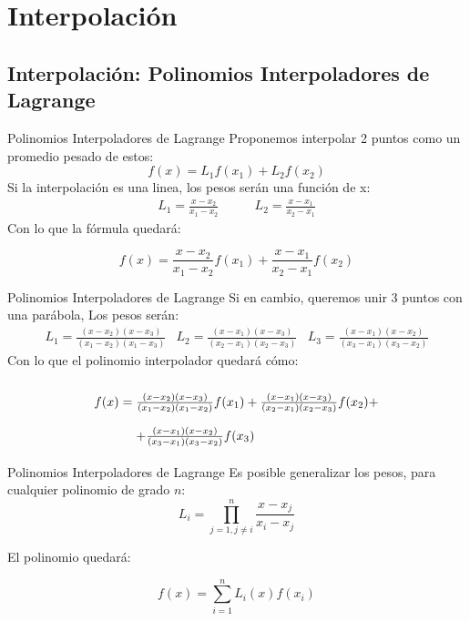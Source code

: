 \documentclass[xcolor=svgnames]{beamer} %
\theoremstyle{plain}
\theoremstyle{definition}
\begin{document}
\section{Interpolación}

\subsection{Interpolación: Polinomios Interpoladores de Lagrange}

\begin{frame}{Polinomios Interpoladores de Lagrange}
  Proponemos interpolar 2 puntos como un promedio pesado de estos:
  $$ f(x) =  L_1 f(x_1) + L_2 f(x_2) $$
  \pause
  Si la interpolación es una linea, los pesos serán una función de x:
  $$ \begin{array}{cc}
  L_1 = \frac{x-x_2}{x_1-x_2} \quad&\quad   L_2 = \frac{x-x_1}{x_2-x_1}
	\end{array}   $$
  \pause
  Con lo que la fórmula quedará:
  \begin{tcolorbox}	
  	$$f(x) = \frac{x-x_2}{x_1-x_2} f(x_1) + \frac{x-x_1}{x_2-x_1} f(x_2)$$
  \end{tcolorbox}

\end{frame}

\begin{frame}{Polinomios Interpoladores de Lagrange}
  Si en cambio, queremos unir 3 puntos con una parábola, Los pesos serán:
  $$\begin{array}{ccc}
  L_1 = \frac{(x-x_2)(x-x_3)}{(x_1-x_2)(x_1-x_3)} & 
  L_2 = \frac{(x-x_1)(x-x_3)}{(x_2-x_1)(x_2-x_3)} & 
  L_3 = \frac{(x-x_1)(x-x_2)}{(x_3-x_1)(x_3-x_2)}
  \end{array}$$
	\pause
  Con lo que el polinomio interpolador quedará cómo:
  \begin{tcolorbox}
  $$\arraycolsep=1.4pt\def\arraystretch{2.2}
   \begin{array}{ccl}
    f(x) &=& \frac{(x-x_2)(x-x_3)}{(x_1-x_2)(x_1-x_2)}f(x_1) +\frac{(x-x_1)(x-x_3)}{(x_2-x_1)(x_2-x_3)}f(x_2) + \\
    & &+\frac{(x-x_1)(x-x_2)}{(x_3-x_1)(x_3-x_2)}f(x_3)  
  \end{array}
    $$ 
  \end{tcolorbox}
\end{frame}


\begin{frame}{Polinomios Interpoladores de Lagrange}
  Es posible generalizar los pesos, para cualquier polinomio de grado $n$:
  $$ L_i = \prod_{j=1,j\neq i}^n \frac{x-x_j}{x_i-x_j} $$

  \pause
  El polinomio quedará:
  \begin{tcolorbox}
    $$ f(x) = \sum_{i=1}^n L_i(x) f(x_i) $$  
  \end{tcolorbox}
\end{frame}
\end{document}
